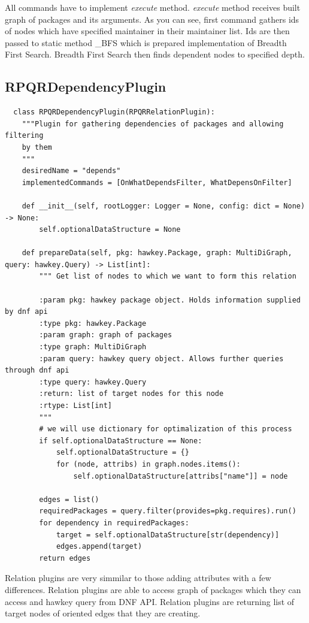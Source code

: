 All commands have to implement \textit{execute} method. \textit{execute} method receives built graph
of packages and its arguments. As you can see, first command gathers ids of nodes which have specified
maintainer in their maintainer list. Ids are then passed to static method \_BFS which is prepared
implementation of Breadth First Search. Breadth First Search then finds dependent nodes to specified
depth.

\newpage

\subsection*{RPQRDependencyPlugin}

\begin{lstlisting}
  class RPQRDependencyPlugin(RPQRRelationPlugin):
    """Plugin for gathering dependencies of packages and allowing filtering
    by them
    """
    desiredName = "depends"
    implementedCommands = [OnWhatDependsFilter, WhatDepensOnFilter]

    def __init__(self, rootLogger: Logger = None, config: dict = None) -> None:
        self.optionalDataStructure = None

    def prepareData(self, pkg: hawkey.Package, graph: MultiDiGraph, query: hawkey.Query) -> List[int]:
        """ Get list of nodes to which we want to form this relation

        :param pkg: hawkey package object. Holds information supplied by dnf api
        :type pkg: hawkey.Package
        :param graph: graph of packages
        :type graph: MultiDiGraph
        :param query: hawkey query object. Allows further queries through dnf api
        :type query: hawkey.Query
        :return: list of target nodes for this node
        :rtype: List[int]
        """
        # we will use dictionary for optimalization of this process
        if self.optionalDataStructure == None:
            self.optionalDataStructure = {}
            for (node, attribs) in graph.nodes.items():
                self.optionalDataStructure[attribs["name"]] = node

        edges = list()
        requiredPackages = query.filter(provides=pkg.requires).run()
        for dependency in requiredPackages:
            target = self.optionalDataStructure[str(dependency)]
            edges.append(target)
        return edges
\end{lstlisting}

Relation plugins are very simmilar to those adding attributes with a few differences. Relation plugins
are able to access graph of packages which they can access and hawkey query from DNF API. Relation
plugins are returning list of target nodes of oriented edges that they are creating.

